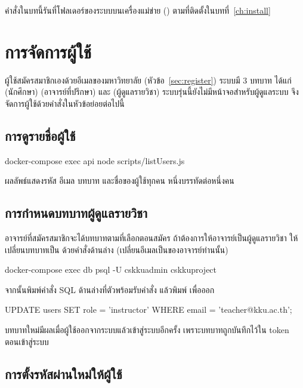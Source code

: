 คำสั่งในบทนี้รันที่โฟลเดอร์ของระบบบนเครื่องแม่ข่าย () ตามที่ติดตั้งในบทที่~\ref{ch:install}

\section{การจัดการผู้ใช้}
\label{sec:users}

ผู้ใช้สมัครสมาชิกเองด้วยอีเมลของมหาวิทยาลัย (หัวข้อ~\ref{sec:register})
ระบบมี 3 บทบาท ได้แก่  (นักศึกษา)  (อาจารย์ที่ปรึกษา)
และ  (ผู้ดูแลรายวิชา) ระบบรุ่นนี้ยังไม่มีหน้าจอสำหรับผู้ดูแลระบบ
จึงจัดการผู้ใช้ด้วยคำสั่งในหัวข้อย่อยต่อไปนี้

\subsection{การดูรายชื่อผู้ใช้}

\begin{terminal}
docker-compose exec api node scripts/listUsers.js
\end{terminal}

ผลลัพธ์แสดงรหัส อีเมล บทบาท และชื่อของผู้ใช้ทุกคน หนึ่งบรรทัดต่อหนึ่งคน

\subsection{การกำหนดบทบาทผู้ดูแลรายวิชา}

อาจารย์ที่สมัครสมาชิกจะได้บทบาทตามที่เลือกตอนสมัคร
ถ้าต้องการให้อาจารย์เป็นผู้ดูแลรายวิชา ให้เปลี่ยนบทบาทเป็น  ด้วยคำสั่งด้านล่าง
(เปลี่ยนอีเมลเป็นของอาจารย์ท่านนั้น)

\begin{terminal}
docker-compose exec db psql -U cskkuadmin cskkuproject
\end{terminal}

จากนั้นพิมพ์คำสั่ง SQL ด้านล่างที่ตัวพร้อมรับคำสั่ง  แล้วพิมพ์ \cmd{\q} เพื่อออก

\begin{terminal}
UPDATE users SET role = 'instructor'
  WHERE email = 'teacher@kku.ac.th';
\end{terminal}

\begin{note}
บทบาทใหม่มีผลเมื่อผู้ใช้ออกจากระบบแล้วเข้าสู่ระบบอีกครั้ง เพราะบทบาทถูกบันทึกไว้ใน token ตอนเข้าสู่ระบบ
\end{note}

\subsection{การตั้งรหัสผ่านใหม่ให้ผู้ใช้}

